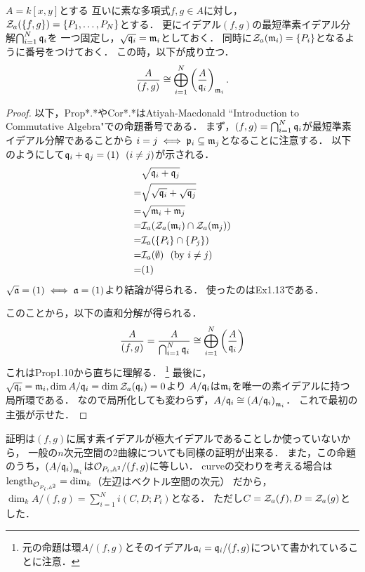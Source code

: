 \documentclass[a4paper]{jsarticle}
\begin{document}
\begin{Prop}
    $A=k[x,y]$とする
    互いに素な多項式$f,g \in A$に対し，
    $\mathcal{Z}_a(\{f,g\})=\{P_1,\dots,P_N\}$とする．
    更にイデアル$(f,g)$の最短準素イデアル分解$\bigcap_{i=1}^N \mathfrak{q}_i$を
    一つ固定し，$\sqrt{\mathfrak{q}_i}=\mathfrak{m}_i$としておく．
    同時に$\mathcal{Z}_a(\mathfrak{m}_i)=\{P_i\}$となるように番号をつけておく．
    この時，以下が成り立つ．
    \[ \frac{A}{(f,g)} \cong \bigoplus_{i=1}^N \left( \frac{A}{\mathfrak{q}_i} \right)_{\mathfrak{m}_i}. \]
\end{Prop}
\begin{proof}
    以下，Prop*.*やCor*.*はAtiyah-Macdonald ``Introduction to Commutative Algebra"での命題番号である．
    まず，$(f,g)=\bigcap_{i=1}^N \mathfrak{q}_i$が最短準素イデアル分解であることから
    $i=j \iff \mathfrak{p}_i \subseteq \mathfrak{m}_j$となることに注意する．
    以下のようにして$\mathfrak{q}_i+\mathfrak{q}_j=(1) ~~(i \neq j)$が示される．
    \begin{align*}
        {}&\sqrt{\mathfrak{q}_i+\mathfrak{q}_j} \\
        =&\sqrt{\sqrt{\mathfrak{q}_i}+\sqrt{\mathfrak{q}_j}} \\
        =&\sqrt{\mathfrak{m}_i+\mathfrak{m}_j} \\
        =&\mathcal{I}_a( \mathcal{Z}_a(\mathfrak{m}_i) \cap \mathcal{Z}_a(\mathfrak{m}_j)) \\
        =&\mathcal{I}_a(\{P_i\} \cap \{P_j\}) \\
        =&\mathcal{I}_a(\emptyset) ~~ (\text{by } i \neq j)\\
        =&(1)
    \end{align*}
    $\sqrt{\mathfrak{a}}=(1) \iff \mathfrak{a}=(1)$より結論が得られる．
    使ったのはEx1.13である．

    このことから，以下の直和分解が得られる．
    \[ \frac{A}{(f,g)}=\frac{A}{\bigcap_{i=1}^N \mathfrak{q}_i}\cong \bigoplus_{i=1}^N \left( \frac{A}{\mathfrak{q}_i} \right) \]
    これはProp1.10から直ちに理解る．
    \footnote{元の命題は環$A/(f,g)$とそのイデアル$\mathfrak{a}_i=\mathfrak{q}_i/(f,g)$について書かれていることに注意．}
    最後に，$\sqrt{\mathfrak{q}_i}=\mathfrak{m}_i, \dim A/\mathfrak{q}_i=\dim \mathcal{Z}_a(\mathfrak{q}_i)=0$より
    $A/\mathfrak{q}_i$は$\mathfrak{m}_i$を唯一の素イデアルに持つ局所環である．
    なので局所化しても変わらず，$A/\mathfrak{q}_i \cong \left( A/\mathfrak{q}_i \right)_{\mathfrak{m}_i}$．
    これで最初の主張が示せた．
\end{proof}

証明は$(f,g)$に属す素イデアルが極大イデアルであることしか使っていないから，
一般の$n$次元空間の2曲線についても同様の証明が出来る．
また，この命題のうち，$\left( A/\mathfrak{q}_i \right)_{\mathfrak{m}_i}$は$\mathcal{O}_{P_i, \mathbb{A}^2}/(f,g)$に等しい．
curveの交わりを考える場合は$\operatorname{length}_{\mathcal{O}_{P_i, \mathbb{A}^2}}=\dim_k$（左辺はベクトル空間の次元）
だから，$\dim_k A/(f,g)=\sum_{i=1}^N i(C,D; P_i)$となる．
ただし$C=\mathcal{Z}_a(f), D=\mathcal{Z}_a(g)$とした．
\end{document}
